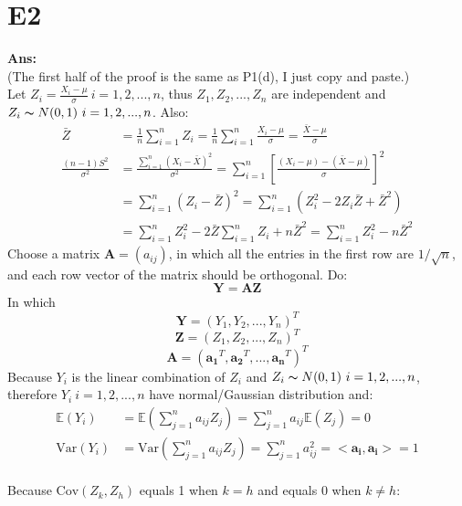 \documentclass[twoside]{homework}
\begin{document}
\section*{E2}
\textbf{Ans:}\\
(The first half of the proof is the same as P1(d), I just copy and paste.)\\
Let $Z_i = \frac{X_i -\mu}{\sigma}\ i=1,2,...,n$, thus $Z_1, Z_2,..., Z_n$ are independent and $Z_i\thicksim N(0,1)\ i=1,2,...,n$. Also:\\
\begin{equation}
    \begin{aligned}
    \bar{Z} &= \frac{1}{n}\sum_{i=1}^{n} Z_i = \frac{1}{n}\sum_{i=1}^{n} \frac{X_i -\mu}{\sigma} = \frac{\bar{X}-\mu}{\sigma}\\
    \frac{(n-1)S^2}{\sigma^2} &= \frac{\sum_{i=1}^{n} (X_i - \bar{X})^2}{\sigma^2} = \sum_{i=1}^{n} [\frac{ (X_i - \mu) - (\bar{X} - \mu)}{\sigma }]^2\\
    &= \sum_{i=1}^{n} (Z_i - \bar{Z})^2 = \sum_{i=1}^{n} (Z_i^2 - 2Z_i\bar{Z} + \bar{Z}^2)\\
    &= \sum_{i=1}^{n}Z_i^2 - 2\bar{Z}\sum_{i=1}^{n}Z_i + n\bar{Z}^2 = \sum_{i=1}^{n}Z_i^2 - n\bar{Z}^2
    \end{aligned}
\end{equation}
Choose a matrix $\bm{A} = (a_{ij})$, in which all the entries in the first row are $1/\sqrt{n}$, and each row vector of the matrix should be orthogonal. Do:\\
$$\bm{Y} = \bm{AZ}$$
In which $$\bm{Y} = (Y_1, Y_2,...,Y_n)^T$$ $$\bm{Z} = (Z_1, Z_2,...,Z_n)^T$$ $$\bm{A} = (\bm{a_1}^T, \bm{a_2}^T,...,\bm{a_n}^T)^T$$
Because $Y_i$ is the linear combination of $Z_i$ and $Z_i\thicksim N(0,1)\ i=1,2,...,n$, therefore $Y_i\ i=1,2,...,n$ have normal/Gaussian distribution and:
\begin{equation}
\begin{aligned}
\mathbb{E}(Y_i) &= \mathbb{E}(\sum_{j=1}^{n} a_{ij}Z_j) = \sum_{j=1}^{n} a_{ij}\mathbb{E}(Z_j) = 0\\
\mathrm{Var}(Y_i) &= \mathrm{Var}(\sum_{j=1}^{n} a_{ij}Z_j) = \sum_{j=1}^{n} a_{ij}^2 = <\bm{a_i}, \bm{a_i}> = 1
\end{aligned}
\end{equation}\\
Because $\mathrm{Cov}(Z_k, Z_h)$ equals 1 when $k=h$ and equals 0 when $k\neq h$:
\end{document}
